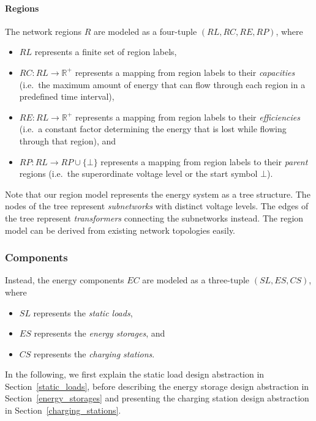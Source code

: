 \paragraph{Regions}
\label{regions}

The network regions $R$ are modeled as a four-tuple $(RL, RC, RE, RP)$, where
\begin{itemize}
	\item $RL$ represents a finite set of region labels,
	\item $RC: RL \rightarrow \mathbb{R}^+$ represents a mapping from region labels to their \textit{capacities} (i.e.\ the maximum amount of energy that can flow through each region in a predefined time interval),
	\item $RE: RL \rightarrow \mathbb{R}^+$ represents a mapping from region labels to their \textit{efficiencies} (i.e.\ a constant factor determining the energy that is lost while flowing through that region), and
	\item $RP: RL \rightarrow RP \cup \{\bot\}$ represents a mapping from region labels to their \textit{parent} regions (i.e.\ the superordinate voltage level or the start symbol $\bot$).
\end{itemize}
Note that our region model represents the energy system as a tree structure. The nodes of the tree represent \textit{subnetworks} with distinct voltage levels. The edges of the tree represent \textit{transformers} connecting the subnetworks instead. The region model can be derived from existing network topologies easily.

\subsubsection{Components}
\label{components}

Instead, the energy components $EC$ are modeled as a three-tuple $(SL, ES, CS)$, where
\begin{itemize}
	\item $SL$ represents the \textit{static loads},
	\item $ES$ represents the \textit{energy storages}, and
	\item $CS$ represents the \textit{charging stations}.
\end{itemize}
In the following, we first explain the static load design abstraction in Section~\ref{static_loads}, before describing the energy storage design abstraction in Section~\ref{energy_storages} and presenting the charging station design abstraction in Section~\ref{charging_stations}.

